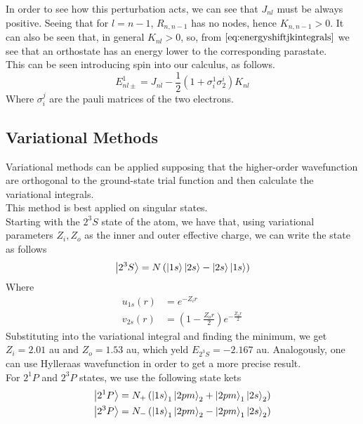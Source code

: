 \documentclass[../qm.tex]{subfiles}
\begin{document}
	In order to see how this perturbation acts, we can see that $J_{nl}$ must be always positive. Seeing that for $l=n-1$, $R_{n,n-1}$ has no nodes, hence $K_{n,n-1}>0$. It can also be seen that, in general $K_{nl}>0$, so, from $\eqref{eq:energyshiftjkintegrals}$ we see that an orthostate has an energy lower to the corresponding parastate.\\
	This can be seen introducing spin into our calculus, as follows.
	\begin{equation}
		E_{nl\pm}^1=J_{nl}-\frac{1}{2}\left( 1+\sigma_i^1\sigma^i_2 \right)K_{nl}
		\label{eq:spinenergyjk}
	\end{equation}
	Where $\sigma_i^j$ are the pauli matrices of the two electrons.\\
	\subsection{Variational Methods}
	Variational methods can be applied supposing that the higher-order wavefunction are orthogonal to the ground-state trial function and then calculate the variational integrals.\\
	This method is best applied on singular states.\\
	Starting with the $2^3S$ state of the atom, we have that, using variational parameters $Z_i,Z_o$ as the inner and outer effective charge, we can write the state as follows
	\begin{equation}
		\ket{2^3S}=N\left( \ket{1s}\ket{2s}-\ket{2s}\ket{1s} \right)
		\label{eq:tripletSvarstate}
	\end{equation}
	Where
	\begin{equation}
		\begin{aligned}
			u_{1s}(r)&=e^{-Z_ir}\\
			v_{2s}(r)&=\left( 1-\frac{Z_or}{2} \right)e^{-\frac{Z_or}{2}}
		\end{aligned}
		\label{eq:trialwavefunctionstripletS}
	\end{equation}
	Substituting into the variational integral and finding the minimum, we get $Z_i=2.01$ au and $Z_o=1.53$ au, which yeld $E_{2^3S}=-2.167$ au. Analogously, one can use Hylleraas wavefunction in order to get a more precise result.\\
	For $2^1P$ and $2^3P$ states, we use the following state kets
	\begin{equation}
		\begin{aligned}
			\ket{2^1P}&=N_+\left( \ket{1s}_1\ket{2pm}_2+\ket{2pm}_1\ket{2s}_2 \right)\\
			\ket{2^3P}&=N_-\left( \ket{1s}_1\ket{2pm}_2-\ket{2pm}_1\ket{2s}_2 \right)
		\end{aligned}
		\label{eq:2SPstateshe}
	\end{equation}
\end{document}
